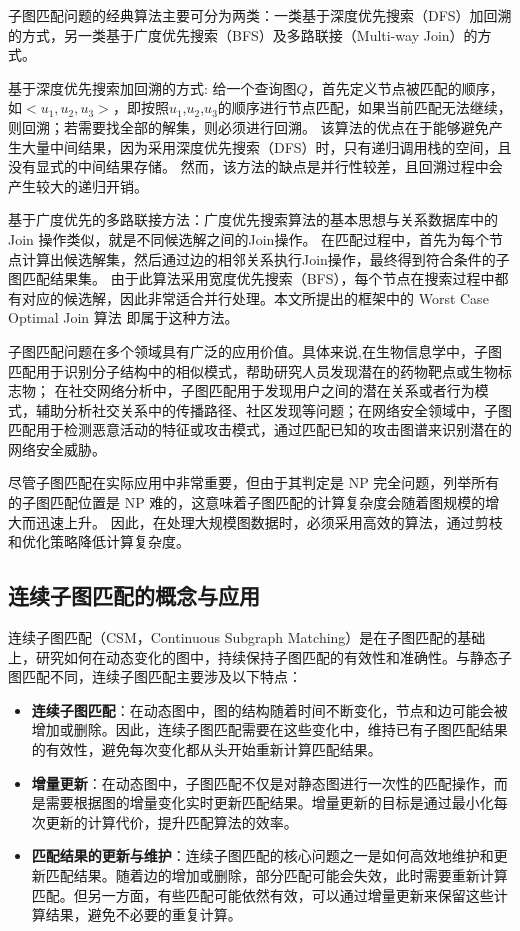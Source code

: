 子图匹配问题的经典算法主要可分为两类：一类基于深度优先搜索（DFS）加回溯的方式\cite{sm-ullmann-DBLP:journals/jacm/Ullmann76}，另一类基于广度优先搜索（BFS）及多路联接（Multi-way Join）的方式\cite{sm-bfs-DBLP:conf/focs/AtseriasGM08}。

基于深度优先搜索加回溯的方式: 给一个查询图$Q$，首先定义节点被匹配的顺序，如$<u_1,u_2,u_3>$，即按照$u_1$,$u_2$,$u_3$的顺序进行节点匹配，如果当前匹配无法继续，则回溯；若需要找全部的解集，则必须进行回溯。
该算法的优点在于能够避免产生大量中间结果，因为采用深度优先搜索（DFS）时，只有递归调用栈的空间，且没有显式的中间结果存储。
然而，该方法的缺点是并行性较差，且回溯过程中会产生较大的递归开销。

基于广度优先的多路联接方法：广度优先搜索算法的基本思想与关系数据库中的 Join 操作类似，就是不同候选解之间的Join操作。
在匹配过程中，首先为每个节点计算出候选解集，然后通过边的相邻关系执行Join操作，最终得到符合条件的子图匹配结果集。
由于此算法采用宽度优先搜索（BFS），每个节点在搜索过程中都有对应的候选解，因此非常适合并行处理。本文所提出的框架中的 Worst Case Optimal Join 算法\cite{sm-bfs-DBLP:conf/focs/AtseriasGM08} 即属于这种方法。


子图匹配问题在多个领域具有广泛的应用价值。具体来说,在生物信息学中，子图匹配用于识别分子结构中的相似模式，帮助研究人员发现潜在的药物靶点或生物标志物；
在社交网络分析中，子图匹配用于发现用户之间的潜在关系或者行为模式，辅助分析社交关系中的传播路径、社区发现等问题；在网络安全领域中，子图匹配用于检测恶意活动的特征或攻击模式，通过匹配已知的攻击图谱来识别潜在的网络安全威胁。

尽管子图匹配在实际应用中非常重要，但由于其判定是 NP 完全问题，列举所有的子图匹配位置是 NP 难的，这意味着子图匹配的计算复杂度会随着图规模的增大而迅速上升。
因此，在处理大规模图数据时，必须采用高效的算法，通过剪枝和优化策略降低计算复杂度。

\subsection{连续子图匹配的概念与应用}
连续子图匹配（CSM，Continuous Subgraph Matching）是在子图匹配的基础上，研究如何在动态变化的图中，持续保持子图匹配的有效性和准确性。与静态子图匹配不同，连续子图匹配主要涉及以下特点：
\begin{itemize}
   \item \textbf{连续子图匹配}：在动态图中，图的结构随着时间不断变化，节点和边可能会被增加或删除。因此，连续子图匹配需要在这些变化中，维持已有子图匹配结果的有效性，避免每次变化都从头开始重新计算匹配结果。
   \item \textbf{增量更新}：在动态图中，子图匹配不仅是对静态图进行一次性的匹配操作，而是需要根据图的增量变化实时更新匹配结果。增量更新的目标是通过最小化每次更新的计算代价，提升匹配算法的效率。
   \item \textbf{匹配结果的更新与维护}：连续子图匹配的核心问题之一是如何高效地维护和更新匹配结果。随着边的增加或删除，部分匹配可能会失效，此时需要重新计算匹配。但另一方面，有些匹配可能依然有效，可以通过增量更新来保留这些计算结果，避免不必要的重复计算。
\end{itemize}

